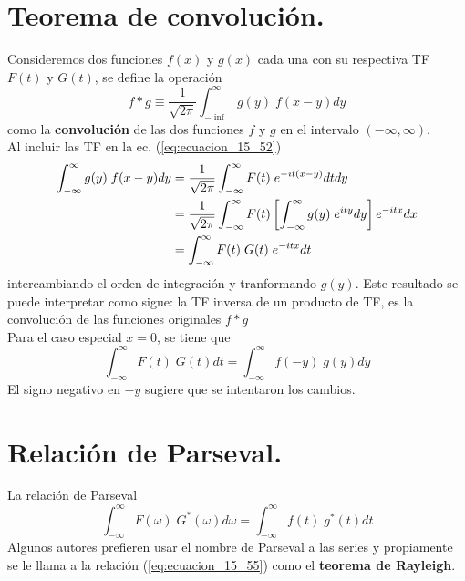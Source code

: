 \section{Teorema de convolución.}
Consideremos dos funciones $f(x)$ y $g(x)$ cada una con su respectiva TF $F(t)$ y $G(t)$, se define la operación
\begin{equation}
f * g \equiv \dfrac{1}{\sqrt{2 \pi}} \int_{-\inf}^{\infty} g(y) \; f(x - y) dy
\label{eq:ecuacion_15_52}
\end{equation}
como la \textbf{convolución} de las dos funciones $f$ y $g$ en el intervalo $(-\infty, \infty)$. 
\\
Al incluir las TF en la ec. (\ref{eq:ecuacion_15_52})
\begin{align}
\int_{-\infty}^{\infty} g(y) \; f(x - y) d y &= \dfrac{1}{\sqrt{2 \pi}} \int_{-\infty}^{\infty} F(t) \; e^{-it(x - y)} dt dy \nonumber \\
&= \dfrac{1}{\sqrt{2 \pi}} \int_{-\infty}^{\infty} F(t) \left[ \int_{-\infty}^{\infty} g(y) \; e^{ity} dy \right] e^{-itx} dx \nonumber \\
&= \int_{-\infty}^{\infty} F(t) \; G(t) \; e^{-itx} dt \label{eq:ecuacion_15_53}
\end{align}
intercambiando el orden de integración y tranformando $g(y)$. Este resultado se puede interpretar como sigue: la TF inversa de un producto de TF, es la convolución de las funciones originales $f * g$
\\
Para el caso especial $x = 0$, se tiene que
\begin{equation}
\int_{-\infty}^{\infty} F(t) \; G(t) dt = \int_{-\infty}^{\infty} f(-y) \; g(y) dy
\label{eq:ecuacion_15_54}
\end{equation}
El signo negativo en $-y$ sugiere que se intentaron los cambios.
\section{Relación de Parseval.}
La relación de Parseval
\begin{equation}
\int_{-\infty}^{\infty} F(\omega) \; G^{*} (\omega) d \omega = \int_{-\infty}^{\infty} f(t) \; g^{*}(t) dt
\label{eq:ecuacion_15_55}
\end{equation}
Algunos autores prefieren usar el nombre de Parseval a las series y propiamente se le llama a la relación (\ref{eq:ecuacion_15_55}) como el \textbf{teorema de Rayleigh}.

